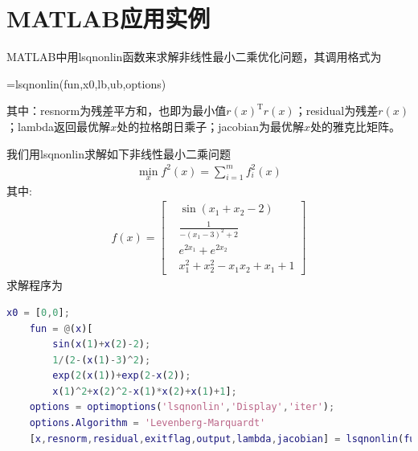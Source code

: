 \section{MATLAB应用实例}
    \par
    MATLAB中用lsqnonlin函数来求解非线性最小二乘优化问题，其调用格式为
    \par
    [x,resnorm,residual,exitflag,output,lambda,jacobian]=lsqnonlin(fun,x0,lb,ub,options)
    \par
    其中：resnorm为残差平方和，也即为最小值$r(x)^\mathrm{T} r(x)$；residual为残差$r(x)$；lambda返回最优解$x$处的拉格朗日乘子；jacobian为最优解$x$处的雅克比矩阵。
    \par
    我们用lsqnonlin求解如下非线性最小二乘问题
    \begin{align*}
    \mathop {\min}\limits_x f^2(x)=\mathop {\sum}\limits_{i=1}^m f_i^2(x)
    \end{align*}
    其中:
    \begin{align*}
    f(x)=\left[
    \begin{aligned}
    &\sin(x_1+x_2-2)\\
    &\frac {1}{-(x_1-3)^2+2}\\
    &e^{2x_1}+e^{2x_2}\\
    &x_1^2+x_2^2-x_1x_2+x_1+1
    \end{aligned}
    \right]
    \end{align*}
    求解程序为
    \begin{lstlisting}[language=Matlab]
    x0 = [0,0];
    fun = @(x)[
        sin(x(1)+x(2)-2);
        1/(2-(x(1)-3)^2);
        exp(2(x(1))+exp(2-x(2));
        x(1)^2+x(2)^2-x(1)*x(2)+x(1)+1];
    options = optimoptions('lsqnonlin','Display','iter');
    options.Algorithm = 'Levenberg-Marquardt'
    [x,resnorm,residual,exitflag,output,lambda,jacobian] = lsqnonlin(fun,x0,IJ,IJ,options)
    \end{lstlisting}

% 
